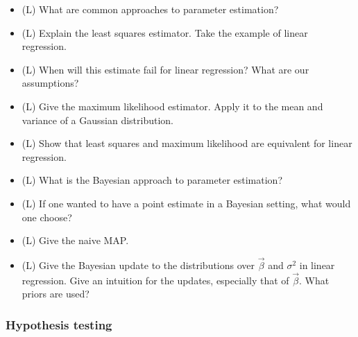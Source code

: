 \begin{itemize}
    \item (L) What are common approaches to parameter estimation?
    \answerboxM
    \item (L) Explain the least squares estimator. Take the example of linear regression.
    \answerboxM
    \item (L) When will this estimate fail for linear regression? What are our assumptions?
    \answerboxM
    \item (L) Give the maximum likelihood estimator. Apply it to the mean and variance of a Gaussian distribution.
    \answerboxM
    \item (L) Show that least squares and maximum likelihood are equivalent for linear regression.
    \answerboxL
    \item (L) What is the Bayesian approach to parameter estimation?
    \answerboxM
    \item (L) If one wanted to have a point estimate in a Bayesian setting, what would one choose?
    \answerboxM
    \item (L) Give the naive MAP.
    \answerboxM
    \item (L) Give the Bayesian update to the distributions over $\vec{\beta}$ and $\sigma^2$ in linear regression.
    Give an intuition for the updates, especially that of $\vec{\beta}$.
    What priors are used?
    \answerboxL
\end{itemize}

\subsubsection*{Hypothesis testing}

